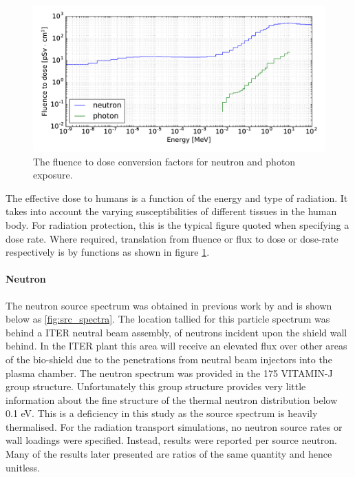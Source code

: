 \begin{figure}[H]
  \includegraphics[width=\textwidth]{icrp74}
  \caption[ICRP74 fluence to dose conversion factors.]{The fluence to dose conversion factors for neutron and photon exposure.}
  \label{fig:icrp74}
\end{figure}

The effective dose to humans is a function of the energy and type of radiation. It takes into account the varying susceptibilities of different tissues in the human body. For radiation protection, this is the typical figure quoted when specifying a dose rate. Where required, translation from fluence or flux to dose or dose-rate respectively is by functions as shown in figure \ref{fig:icrp74}.

\paragraph{Neutron}
The neutron source spectrum was obtained in previous work by \citeauthor{Jakhar16} and is shown below as \ref{fig:src_spectra}. The location tallied for this particle spectrum was behind a ITER neutral beam assembly, of neutrons incident upon the shield wall behind. In the ITER plant this area will receive an elevated flux over other areas of the bio-shield due to the penetrations from neutral beam injectors into the plasma chamber. The neutron spectrum was provided in the 175 VITAMIN-J group structure. Unfortunately this group structure provides very little information about the fine structure of the thermal neutron distribution below 0.1 eV. This is a deficiency in this study as the source spectrum is heavily thermalised. For the radiation transport simulations, no neutron source rates or wall loadings were specified. Instead, results were reported per source neutron. Many of the results later presented are ratios of the same quantity and hence unitless. 

